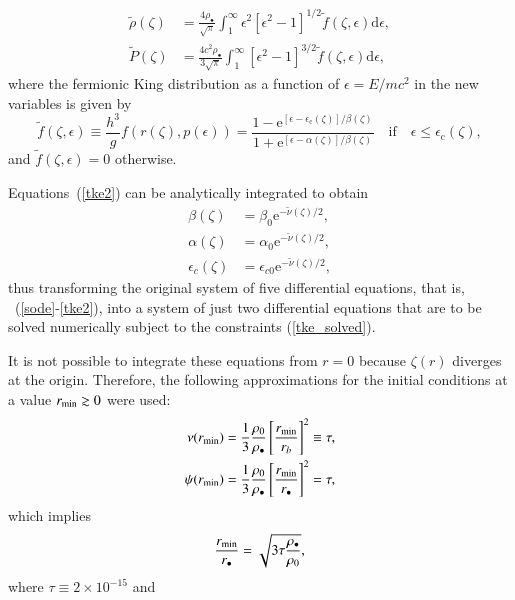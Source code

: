 \documentclass[twocolumn]{aa}
\begin{document}
\begin{appendix}
\begin{align}
    \tilde{\rho}(\zeta)&=\frac{4\rho_{\bullet}}{\sqrt{\pi}}\int^\infty_1\epsilon^2[\epsilon^2-1]^{1/2}\tilde{f}(\zeta,\epsilon)\mathrm{d}\epsilon,\\
   \tilde{P}(\zeta)&=\frac{4c^2\rho_{\bullet}}{3\sqrt{\pi}}\int^\infty_1[\epsilon^2-1]^{3/2}\tilde{f}(\zeta,\epsilon)\mathrm{d}\epsilon,
\end{align}
where the fermionic King distribution as a function of
$\epsilon=E/mc^2$ in the new variables is given by
\begin{equation}
\tilde{f}(\zeta,\epsilon)\equiv \frac{h^3}{g}f(r(\zeta),p(\epsilon))=
      \frac{1-\mathrm {e}^{[\epsilon-\epsilon_\mathrm{c}(\zeta)]/\beta(\zeta)}}
      {1+\mathrm {e}^{[\epsilon-\alpha(\zeta)]/\beta(\zeta)}}\quad\mathrm{if}\quad \epsilon \leq \epsilon_\mathrm{c}(\zeta),
\end{equation}
and $\tilde{f}(\zeta,\epsilon) = 0$ otherwise.

Equations~(\ref{tke2}) can be analytically integrated to obtain
\begin{align}
 \beta(\zeta) &= \beta_0\mathrm{e}^{-\tilde{\nu}(\zeta)/2}, \nonumber\\
 \alpha(\zeta) &= \alpha_0\mathrm{e}^{-\tilde{\nu}(\zeta)/2}, \nonumber\\
 \epsilon_c(\zeta) &= \epsilon_{c0}\mathrm{e}^{-\tilde{\nu}(\zeta)/2},
 \label{tke_solved}
\end{align}
thus transforming the original system of five differential equations, that is, ~(\ref{sode}-\ref{tke2}), into a system of just two differential equations that are to be solved numerically subject to the constraints (\ref{tke_solved}).

It is not possible to integrate these equations from $r=0$ because $\zeta(r)$ diverges at the origin.
Therefore, the following approximations for the initial conditions at a value $r_{\rm{min}}\gtrsim 0$ were used:
\begin{align}
   \nu(r_{\rm{min}}) &= \frac{1}{3}\frac{\rho_0}{\rho_\bullet}\left[\frac{r_{\rm{min}}}{r_b}\right]^2\equiv \tau, \\
   \psi(r_{\rm{min}})&= \frac{1}{3}\frac{\rho_0}{\rho_\bullet}\left[\frac{r_{\rm{min}}}{r_\bullet}\right]^2 = \tau,
\end{align}
which implies
\begin{equation}
   \frac{r_{\rm{min}}}{r_\bullet}=\sqrt{3\tau\frac{\rho_\bullet}{\rho_0}},
\end{equation}
where
$\tau\equiv 2\times10^{-15}$ and


\end{appendix}
\end{document}
